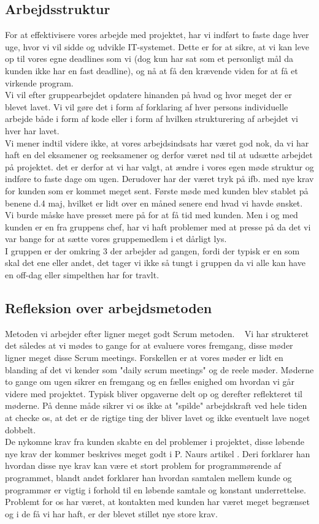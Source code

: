 \documentclass[a4paper]{article}
\begin{document}
\subsection{Arbejdsstruktur}
For at effektivisere vores arbejde med projektet, har vi indført to faste dage hver uge, hvor vi vil sidde og udvikle IT-systemet. Dette er for at sikre, at vi kan leve op til vores egne deadlines som vi (dog kun har sat som et personligt mål da kunden ikke har en fast deadline), og nå at få den krævende viden for at få et virkende program.\\
Vi vil efter gruppearbejdet opdatere hinanden på hvad og hvor meget der er blevet lavet. Vi vil gøre det i form af forklaring af hver persons individuelle arbejde både i form af kode eller i form af hvilken strukturering af arbejdet vi hver har lavet.\\
Vi mener indtil videre ikke, at vores arbejdsindsats har været god nok, da vi har haft en del eksamener og reeksamener og derfor været nød til at udsætte arbejdet på projektet. det er derfor at vi har valgt, at ændre i vores egen møde struktur og indføre to faste dage om ugen.
Derudover har der været tryk på ifb. med nye krav for kunden som er kommet meget sent. Første møde med kunden blev stablet på benene d.4 maj, hvilket er lidt over en måned senere end hvad vi havde ønsket. Vi burde  måske have presset mere på for at få tid med kunden. Men i og med kunden er en fra gruppens chef, har vi haft problemer med at presse på da det vi var bange for at sætte vores gruppemedlem i et dårligt lys.\\
I gruppen er der omkring 3 der arbejder ad gangen, fordi der typisk er en som skal det ene eller andet, det tager vi ikke så tungt i gruppen da vi alle kan have en off-dag eller simpelthen har for travlt.\\
\subsection{Refleksion over arbejdsmetoden}
Metoden vi arbejder efter ligner meget godt Scrum metoden. ~\cite{Scrum} Vi har strukteret det således at vi mødes to gange for at evaluere vores fremgang, disse møder ligner meget disse Scrum meetings. Forskellen er at vores møder er lidt en blanding af det vi kender som "daily scrum meetings" og de reele møder. Møderne to gange om ugen sikrer en fremgang og en fælles enighed om hvordan vi går videre med projektet. Typisk bliver opgaverne delt op og derefter reflekteret til møderne. På denne måde sikrer vi os ikke at "spilde" arbejdskraft ved hele tiden at checke os, at det er de rigtige ting der bliver lavet og ikke eventuelt lave noget dobbelt.\\
De nykomne krav fra kunden skabte en del problemer i projektet, disse løbende nye krav der kommer beskrives meget godt i P. Naurs artikel \cite{NaurProgramming}. Deri forklarer han hvordan disse nye krav kan være et stort problem for programmørende af programmet, blandt andet forklarer han hvordan samtalen mellem kunde og programmør er vigtig i forhold til en løbende samtale og konstant underrettelse. Problemt for os har været, at kontakten med kunden har været meget begrænset og i de få vi har haft, er der blevet stillet nye store krav.
\newpage
\end{document}
